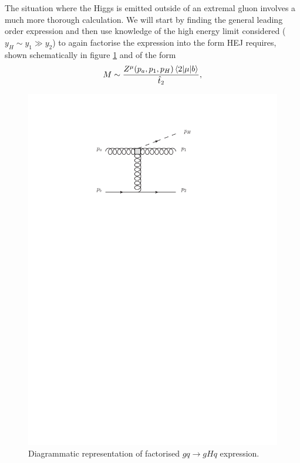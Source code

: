 The situation where the Higgs is emitted outside of an extremal gluon involves a much more thorough calculation. We will start by finding the general leading order expression and then use knowledge of the high energy limit considered ($y_H \sim y_1 \gg y_2$) to again factorise the expression into the form HEJ requires, shown schematically in figure \ref{fig:gqH_imp} and of the form
\begin{equation}
M \sim \frac{Z^{\mu}(p_a,p_1,p_H) \mathinner{\langle2\vert\mu\vert b\rangle}_{}}{\hat{t}_2},
\label{eqn:higgseff}
\end{equation}
\begin{figure}[t]
\centering
\includegraphics{Images/qgh_impact_factor.pdf}
\caption{Diagrammatic representation of factorised $gq \to gHq$ expression.}
\label{fig:gqH_imp}
\end{figure}

